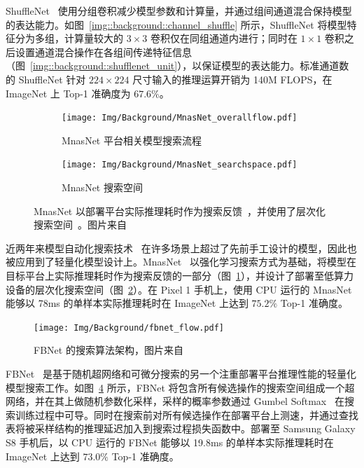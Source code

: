 ShuffleNet~\citep{zhang2018shufflenet} 使用分组卷积减少模型参数和计算量，并通过组间通道混合保持模型的表达能力。如图~\ref{img::background::channel_shuffle} 所示，ShuffleNet 将模型特征分为多组，计算量较大的 $3\times 3$ 卷积仅在同组通道内进行；同时在 $1 \times 1$ 卷积之后设置通道混合操作在各组间传递特征信息（图~\ref{img::background::shufflenet_unit}），以保证模型的表达能力。标准通道数的 ShuffleNet 针对 $224\times 224$ 尺寸输入的推理运算开销为 140M FLOPS，在 ImageNet 上 Top-1 准确度为 $67.6\%$。

\begin{figure}[htb]
  \centering
  \begin{subfigure}[t]{0.35\columnwidth}
    \centering
    \texttt{[image: Img/Background/MnasNet\_overallflow.pdf]}
    \caption{MnasNet 平台相关模型搜索流程}
    \label{img::background::mnasnet_overall_flow}
  \end{subfigure}
  \quad
  \begin{subfigure}[t]{0.6\columnwidth}
    \centering
    \texttt{[image: Img/Background/MnasNet\_searchspace.pdf]}
    \caption{MnasNet 搜索空间}
    \label{img::background::mnasnet_search_space}
  \end{subfigure}
  \caption{MnasNet 以部署平台实际推理耗时作为搜索反馈~，并使用了层次化搜索空间~。图片来自~\citet{tan2019mnasnet}}
  \label{img::background::mnasnet}
\end{figure}

近两年来模型自动化搜索技术~\citep{zoph2018learning, liu2018darts, lu2019nsga} 在许多场景上超过了先前手工设计的模型，因此也被应用到了轻量化模型设计上。MnasNet~\citep{tan2019mnasnet} 以强化学习搜索方式为基础，将模型在目标平台上实际推理耗时作为搜索反馈的一部分（图~\ref{img::background::mnasnet_overall_flow}），并设计了部署至低算力设备的层次化搜索空间（图~\ref{img::background::mnasnet_search_space}）。在 Pixel 1 手机上，使用 CPU 运行的 MnasNet 能够以 78ms 的单样本实际推理耗时在 ImageNet 上达到 $75.2\%$ Top-1 准确度。

\begin{figure}[htb]
  \centering
  \texttt{[image: Img/Background/fbnet\_flow.pdf]}
  \caption{FBNet 的搜索算法架构，图片来自~\citet{wu2019fbnet}}
  \label{img::background::fbnet}
\end{figure}

FBNet~\citep{wu2019fbnet} 是基于随机超网络和可微分搜索的另一个注重部署平台推理性能的轻量化模型搜索工作。如图~\ref{img::background::fbnet} 所示，FBNet 将包含所有候选操作的搜索空间组成一个超网络，并在其上做随机参数化采样，采样的概率参数通过 Gumbel Softmax~\citep{jang2016categorical, maddison2016concrete} 在搜索训练过程中可导。同时在搜索前对所有候选操作在部署平台上测速，并通过查找表将被采样结构的推理延迟加入到搜索过程损失函数中。部署至 Samsung Galaxy S8 手机后，以 CPU 运行的 FBNet 能够以 19.8ms 的单样本实际推理耗时在 ImageNet 上达到 $73.0\%$ Top-1 准确度。

